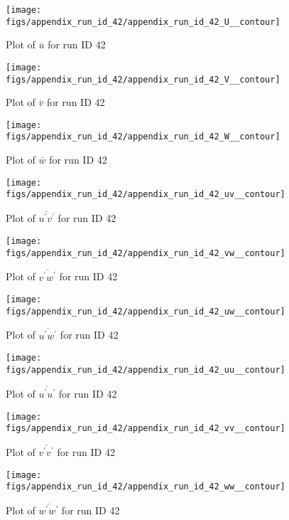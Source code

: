 \begin{figure}[H]
\centering
\texttt{[image: figs/appendix\_run\_id\_42/appendix\_run\_id\_42\_U\_\_contour]}
\caption{Plot of $\overline{u}$ for run ID 42}
\label{fig:appendix_run_id_42_U__contour}
\end{figure}


\begin{figure}[H]
\centering
\texttt{[image: figs/appendix\_run\_id\_42/appendix\_run\_id\_42\_V\_\_contour]}
\caption{Plot of $\overline{v}$ for run ID 42}
\label{fig:appendix_run_id_42_V__contour}
\end{figure}


\begin{figure}[H]
\centering
\texttt{[image: figs/appendix\_run\_id\_42/appendix\_run\_id\_42\_W\_\_contour]}
\caption{Plot of $\overline{w}$ for run ID 42}
\label{fig:appendix_run_id_42_W__contour}
\end{figure}


\begin{figure}[H]
\centering
\texttt{[image: figs/appendix\_run\_id\_42/appendix\_run\_id\_42\_uv\_\_contour]}
\caption{Plot of $\overline{u^\prime v^\prime}$ for run ID 42}
\label{fig:appendix_run_id_42_uv__contour}
\end{figure}


\begin{figure}[H]
\centering
\texttt{[image: figs/appendix\_run\_id\_42/appendix\_run\_id\_42\_vw\_\_contour]}
\caption{Plot of $\overline{v^\prime w^\prime}$ for run ID 42}
\label{fig:appendix_run_id_42_vw__contour}
\end{figure}


\begin{figure}[H]
\centering
\texttt{[image: figs/appendix\_run\_id\_42/appendix\_run\_id\_42\_uw\_\_contour]}
\caption{Plot of $\overline{u^\prime w^\prime}$ for run ID 42}
\label{fig:appendix_run_id_42_uw__contour}
\end{figure}


\begin{figure}[H]
\centering
\texttt{[image: figs/appendix\_run\_id\_42/appendix\_run\_id\_42\_uu\_\_contour]}
\caption{Plot of $\overline{u^\prime u^\prime}$ for run ID 42}
\label{fig:appendix_run_id_42_uu__contour}
\end{figure}


\begin{figure}[H]
\centering
\texttt{[image: figs/appendix\_run\_id\_42/appendix\_run\_id\_42\_vv\_\_contour]}
\caption{Plot of $\overline{v^\prime v^\prime}$ for run ID 42}
\label{fig:appendix_run_id_42_vv__contour}
\end{figure}


\begin{figure}[H]
\centering
\texttt{[image: figs/appendix\_run\_id\_42/appendix\_run\_id\_42\_ww\_\_contour]}
\caption{Plot of $\overline{w^\prime w^\prime}$ for run ID 42}
\label{fig:appendix_run_id_42_ww__contour}
\end{figure}


